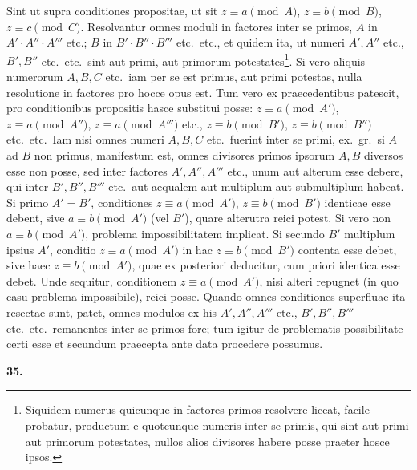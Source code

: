 \documentclass[12pt,a4paper]{article}
\theoremstyle{plain}
\theoremstyle{definition}
\theoremstyle{remark}
\begin{document}
Sint ut supra conditiones propositae, ut sit $z \equiv a \pmod{A}$, $z \equiv b \pmod{B}$, $z \equiv c \pmod{C}$. Resolvantur omnes moduli in factores inter se primos, $A$ in $A' \cdot A'' \cdot A'''$ etc.; $B$ in $B' \cdot B'' \cdot B'''$ etc.\ etc., et quidem ita, ut numeri $A', A''$ etc., $B', B''$ etc.\ etc.\ sint aut primi, aut primorum potestates\footnote{Siquidem numerus quicunque in factores primos resolvere liceat, facile probatur, productum e quotcunque numeris inter se primis, qui sint aut primi aut primorum potestates, nullos alios divisores habere posse praeter hosce ipsos.}. Si vero aliquis numerorum $A, B, C$ etc.\ iam per se est primus, aut primi potestas, nulla resolutione in factores pro hocce opus est. Tum vero ex praecedentibus patescit, pro conditionibus propositis hasce substitui posse: $z \equiv a \pmod{A'}$, $z \equiv a \pmod{A''}$, $z \equiv a \pmod{A'''}$ etc., $z \equiv b \pmod{B'}$, $z \equiv b \pmod{B''}$ etc.\ etc.\ Iam nisi omnes numeri $A, B, C$ etc.\ fuerint inter se primi, ex.~gr.\ si $A$ ad $B$ non primus, manifestum est, omnes divisores primos ipsorum $A, B$ diversos esse non posse, sed inter factores $A', A'', A'''$ etc., unum aut alterum esse debere, qui inter $B', B'', B'''$ etc.\ aut aequalem aut multiplum aut submultiplum habeat. Si primo $A' = B'$, conditiones $z \equiv a \pmod{A'}$, $z \equiv b \pmod{B'}$ identicae esse debent, sive $a \equiv b \pmod{A'}$ (vel $B'$), quare alterutra reici potest. Si vero non $a \equiv b \pmod{A'}$, problema impossibilitatem implicat. Si secundo $B'$ multiplum ipsius $A'$, conditio $z \equiv a \pmod{A'}$ in hac $z \equiv b \pmod{B'}$ contenta esse debet, sive haec $z \equiv b \pmod{A'}$, quae ex posteriori deducitur, cum priori identica esse debet. Unde sequitur, conditionem $z \equiv a \pmod{A'}$, nisi alteri repugnet (in quo casu problema impossibile), reici posse. Quando omnes conditiones superfluae ita resectae sunt, patet, omnes modulos ex his $A', A'', A'''$ etc., $B', B'', B'''$ etc.\ etc.\ remanentes inter se primos fore; tum igitur de problematis possibilitate certi esse et secundum praecepta ante data procedere possumus.

\textbf{35.}
\end{document}
